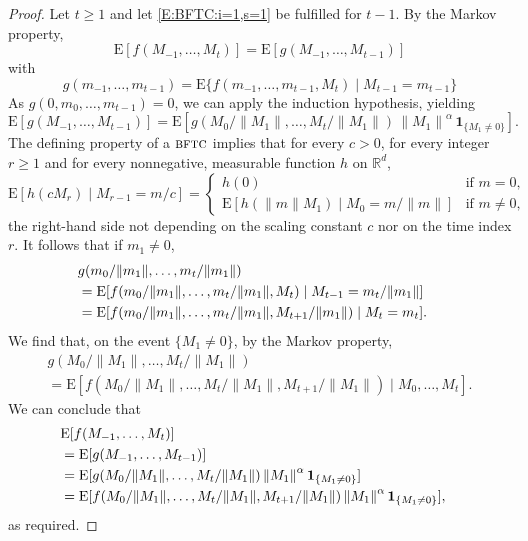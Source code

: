 \documentclass{aptpubarxiv}
\numberwithin{equation}{section}
\begin{document}
\begin{proof}
Let $t \ge 1$ and let \eqref{E:BFTC:i=1,s=1} be fulfilled for $t-1$.
By the Markov property,
\[
  {\mathrm{E}} [ f ( M_{-1}, \ldots, M_t ) ]
  = {\mathrm{E}} [ g ( M_{-1}, \ldots, M_{t-1} ) ]
\]
with
\[
  g( m_{-1}, \ldots, m_{t-1} ) = {\mathrm{E}} \{ f ( m_{-1}, \ldots, m_{t-1}, M_t ) \mid M_{t-1} = m_{t-1} \}
\]
As $g(0, m_0, \ldots, m_{t-1}) = 0$, we can apply the induction hypothesis, yielding
\[
  {\mathrm{E}} [ g ( M_{-1}, \ldots, M_{t-1} ) ]
  = {\mathrm{E}} [ g ( M_0 / {\|{M_1}\|}, \ldots, M_t / {\|{M_1}\|} ) \, {\|{M_1}\|}^\alpha \, {\boldsymbol{1}}_{ \{ M_1 \ne 0 \} } ].
\]
The defining property of a ${\mbox{\sc bftc}}$ implies that for every $c > 0$, for every integer $r \ge 1$ and for every nonnegative, measurable function $h$ on ${\mathbb{R}}^d$,
\begin{equation}
\label{eq:bftc:scaling:forward}
 {\mathrm{E}} [ h( c M_r ) \mid M_{r-1} = m/c ]
  = \begin{cases} h(0) & \text{if $m = 0$,} \\ {\mathrm{E}} [ h( {\|{m}\|} M_1 ) \mid M_0 = m / {\|{m}\|} ] & \text{if $m \ne 0$,} \end{cases}
\end{equation}
the right-hand side not depending on the scaling constant $c$ nor on the time index $r$. It follows that if $m_1 \ne 0$,
\begin{align*}
  \lefteqn{
  g ( m_0 / {\|{m_1}\|}, \ldots, m_t / {\|{m_1}\|} )
  } \\
  &= {\mathrm{E}} [ f ( m_0 / {\|{m_1}\|}, \ldots, m_t / {\|{m_1}\|}, M_t ) \mid M_{t-1} = m_t / {\|{m_1}\|} ] \\
  &= {\mathrm{E}} [ f ( m_0 / {\|{m_1}\|}, \ldots, m_t / {\|{m_1}\|}, M_{t+1} / {\|{m_1}\|} ) \mid M_t = m_t ].
\end{align*}
We find that, on the event $\{M_1 \ne 0\}$, by the Markov property,
\begin{multline*}
  g ( M_0 / {\|{M_1}\|}, \ldots, M_t / {\|{M_1}\|} ) \\
  = {\mathrm{E}} [ f ( M_0 / {\|{M_1}\|}, \ldots, M_t / {\|{M_1}\|}, M_{t+1} / {\|{M_1}\|} ) \mid M_0, \ldots, M_t ].
\end{multline*}
We can conclude that
\begin{align*}
  \lefteqn{
  {\mathrm{E}} [ f ( M_{-1}, \ldots, M_t ) ]
  } \\
  &= {\mathrm{E}} [ g ( M_{-1}, \ldots, M_{t-1} ) ] \\
  &= {\mathrm{E}} [ g ( M_0 / {\|{M_1}\|}, \ldots, M_t / {\|{M_1}\|} ) \, {\|{M_1}\|}^\alpha \, {\boldsymbol{1}}_{ \{ M_1 \ne 0 \} } ] \\
  &= {\mathrm{E}} [ f ( M_0 / {\|{M_1}\|}, \ldots, M_t / {\|{M_1}\|}, M_{t+1} / {\|{M_1}\|} ) \, {\|{M_1}\|}^\alpha \, {\boldsymbol{1}}_{ \{ M_1 \ne 0 \} } ],
\end{align*}
as required.


\end{proof}
\end{document}
